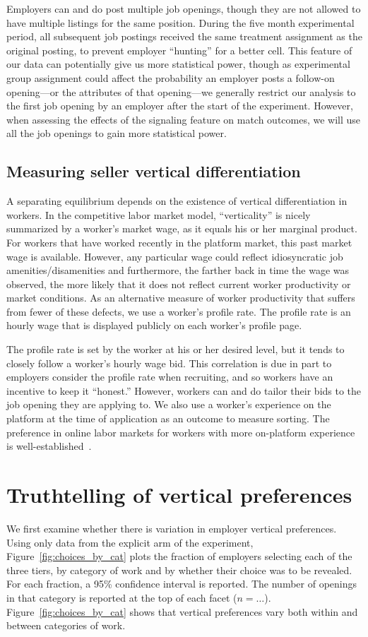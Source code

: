 \documentclass[12pt]{article}
\begin{document}
Employers can and do post multiple job openings, though they are not allowed to have multiple listings for the same position. 
During the five month experimental period, all subsequent job postings received the same treatment assignment as the original posting, to prevent employer ``hunting'' for a better cell.
This feature of our data can potentially give us more statistical power, though as experimental group assignment could affect the probability an employer posts a follow-on opening---or the attributes of that opening---we generally restrict our analysis to the first job opening by an employer after the start of the experiment.  
However, when assessing the effects of the signaling feature on match outcomes, we will use all the job openings to gain more statistical power.

\subsection{Measuring seller vertical differentiation} 
A separating equilibrium depends on the existence of vertical differentiation in workers.
In the competitive labor market model, ``verticality'' is nicely summarized by a worker's market wage, as it equals his or her marginal product.
For workers that have worked recently in the platform market, this past market wage is available.
However, any particular wage could reflect idiosyncratic job amenities/disamenities and furthermore, the farther back in time the wage was observed, the more likely that it does not reflect current worker productivity or market conditions. 
As an alternative measure of worker productivity that suffers from fewer of these defects, we use a worker's profile rate. 
The profile rate is an hourly wage that is displayed publicly on each worker's profile page.

The profile rate is set by the worker at his or her desired level, but it tends to closely follow a worker's hourly wage bid.
This correlation is due in part to employers consider the profile rate when recruiting, and so workers have an incentive to keep it ``honest.''
However, workers can and do tailor their bids to the job opening they are applying to. 
We also use a worker's experience on the platform at the time of application as an outcome to measure sorting.
The preference in online labor markets for workers with more on-platform experience is well-established~\citep{pallais2010inefficient, stanton2011landing}.

\section{Truthtelling of vertical preferences} \label{sec:results_existence}
We first examine whether there is variation in employer vertical preferences. 
Using only data from the explicit arm of the experiment, Figure~\ref{fig:choices_by_cat} plots the fraction of employers selecting each of the three tiers, by category of work and by whether their choice was to be revealed.
For each fraction, a 95\% confidence interval is reported. 
The number of openings in that category is reported at the top of each facet ($n = \ldots$). 
Figure~\ref{fig:choices_by_cat} shows that vertical preferences vary both within and between categories of work.
\end{document}
